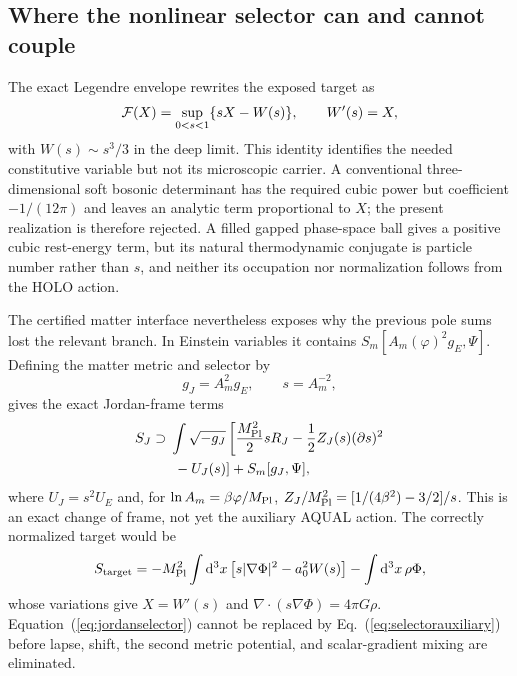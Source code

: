 \documentclass[10pt]{article}
\newcommand{\dd}{\mathrm{d}}
\begin{document}
\subsection{Where the nonlinear selector can and cannot couple}

The exact Legendre envelope rewrites the exposed target as
\begin{equation}
 {\cal F}(X)=\sup_{0<s<1}\{sX-W(s)\},\qquad W'(s)=X,
 \label{eq:legendreselector}
\end{equation}
with $W(s)\sim s^3/3$ in the deep limit.  This identity identifies the needed
constitutive variable but not its microscopic carrier.  A conventional
three-dimensional soft bosonic determinant has the required cubic power but
coefficient $-1/(12\pi)$ and leaves an analytic term proportional to $X$;
the present realization is therefore rejected.  A filled gapped phase-space
ball gives a positive cubic rest-energy term, but its natural thermodynamic
conjugate is particle number rather than $s$, and neither its occupation nor
normalization follows from the HOLO action.

The certified matter interface nevertheless exposes why the previous pole
sums lost the relevant branch.  In Einstein variables it contains
$S_m[A_m(\varphi)^2g_E,\Psi]$.  Defining the matter metric and selector by
\begin{equation}
 g_J=A_m^2g_E,\qquad s=A_m^{-2},
\end{equation}
gives the exact Jordan-frame terms
\begin{equation}
 \begin{split}
 S_J\supset{}&\int\sqrt{-g_J}\left[
 \frac{M_{\rm Pl}^2}{2}sR_J-\frac12 Z_J(s)(\partial s)^2\right.\\
 &\left.{}-U_J(s)\right]+S_m[g_J,\Psi],
 \end{split}
 \label{eq:jordanselector}
\end{equation}
where $U_J=s^2U_E$ and, for
$\ln A_m=\beta\varphi/M_{\rm Pl}$,
$Z_J/M_{\rm Pl}^2=[1/(4\beta^2)-3/2]/s$.  This is an exact change of frame,
not yet the auxiliary AQUAL action.  The correctly normalized target would be
\begin{equation}
 S_{\rm target}=-M_{\rm Pl}^2\int\dd^3x
 \left[s|\nabla\Phi|^2-a_0^2W(s)\right]-\int\dd^3x\,\rho\Phi ,
 \label{eq:selectorauxiliary}
\end{equation}
whose variations give $X=W'(s)$ and
$\nabla\cdot(s\nabla\Phi)=4\pi G\rho$.  Equation~(\ref{eq:jordanselector})
cannot be replaced by Eq.~(\ref{eq:selectorauxiliary}) before lapse, shift,
the second metric potential, and scalar-gradient mixing are eliminated.
\end{document}
